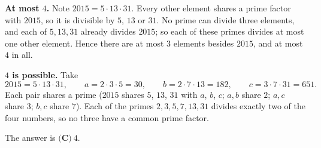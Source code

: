 \textbf{At most $4$.} Note $2015=5\cdot13\cdot31$. Every other element shares a prime factor with $2015$, so it is divisible by $5$, $13$ or $31$. No prime can divide three elements, and each of $5,13,31$ already divides $2015$; so each of these primes divides at most one other element. Hence there are at most $3$ elements besides $2015$, and at most $4$ in all.

\textbf{$4$ is possible.} Take
\[
2015=5\cdot13\cdot31,\qquad a=2\cdot3\cdot5=30,\qquad b=2\cdot7\cdot13=182,\qquad c=3\cdot7\cdot31=651 .
\]
Each pair shares a prime ($2015$ shares $5$, $13$, $31$ with $a$, $b$, $c$; $a,b$ share $2$; $a,c$ share $3$; $b,c$ share $7$). Each of the primes $2,3,5,7,13,31$ divides exactly two of the four numbers, so no three have a common prime factor.

The answer is $\boxed{\textbf{(C)}\ 4}$.
